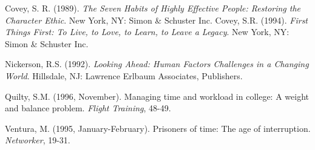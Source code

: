 \documentclass[twocolumn]{article}
\begin{document}
\begin{thebibliography}{9}
   Covey, S. R. (1989). \textit{The Seven Habits of Highly
  Effective People: Restoring the Character Ethic}. New York, NY: Simon \& Schuster Inc.
   Covey, S.R. (1994). \textit{First Things First: To Live, to
  Love, to Learn, to Leave a Legacy}. New York, NY: Simon \& Schuster Inc.

   Nickerson, R.S. (1992). \textit{Looking Ahead: Human
  Factors Challenges in a Changing World}. Hillsdale, NJ: Lawrence Erlbaum Associates, Publishers.

   Quilty, S.M. (1996, November). Managing time and workload
  in college: A weight and balance problem. \textit{Flight Training}, 48-49.

   Ventura, M. (1995, January-February). Prisoners of time:
  The age of interruption. \textit{Networker}, 19-31.
\end{thebibliography}
\end{document}
